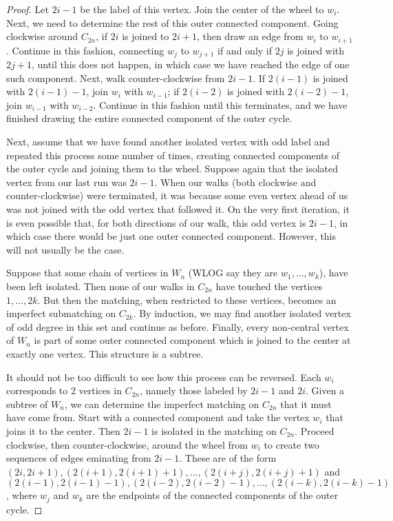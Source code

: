 \documentclass[12pt]{article}
\begin{document}
\begin{enumerate}[leftmargin=0cm,itemindent=.5cm,labelwidth=\itemindent,labelsep=0cm,align=left]
\begin{proof}
Let $2i-1$ be the label of this vertex.  Join the center of the wheel to $w_i$.  Next, we need to determine the rest of this outer connected component.  Going clockwise around $C_{2n}$, if $2i$ is joined to $2i+1$, then draw an edge from $w_i$ to $w_{i+1}$.  Continue in this fashion, connecting $w_j$ to $w_{j+1}$ if and only if $2j$ is joined with $2j+1$, until this does not happen, in which case we have reached the edge of one such component.  Next, walk counter-clockwise from $2i-1$.  If $2(i-1)$ is joined with $2(i-1) - 1$, join $w_i$ with $w_{i-1}$; if $2(i-2)$ is joined with $2(i-2) - 1$, join $w_{i-1}$ with $w_{i-2}$.  Continue in this fashion until this terminates, and we have finished drawing the entire connected component of the outer cycle.

Next, assume that we have found another isolated vertex with odd label and repeated this process some number of times, creating connected components of the outer cycle and joining them to the wheel.  Suppose again that the isolated vertex from our last run was $2i-1$.  When our walks (both clockwise and counter-clockwise) were terminated, it was because some even vertex ahead of us was not joined with the odd vertex that followed it.  On the very first iteration, it is even possible that, for both directions of our walk, this odd vertex is $2i-1$, in which case there would be just one outer connected component.  However, this will not usually be the case.

Suppose that some chain of vertices in $W_n$ (WLOG say they are $w_1, \dots , w_k$), have been left isolated.  Then none of our walks in $C_{2n}$ have touched the vertices $1, \dots , 2k$.  But then the matching, when restricted to these vertices, becomes an imperfect submatching on $C_{2k}$.  By induction, we may find another isolated vertex of odd degree in this set and continue as before.  Finally, every non-central vertex of $W_n$ is part of some outer connected component which is joined to the center at exactly one vertex.  This structure is a subtree.

It should not be too difficult to see how this process can be reversed.  Each $w_i$ corresponds to 2 vertices in $C_{2n}$, namely those labeled by $2i-1$ and $2i$.  Given a subtree of $W_n$, we can determine the imperfect matching on $C_{2n}$ that it must have come from.  Start with a connected component and take the vertex $w_i$ that joins it to the center.  Then $2i-1$ is isolated in the matching on $C_{2n}$.  Proceed clockwise, then counter-clockwise, around the wheel from $w_i$ to create two sequences of edges eminating from $2i-1$.  These are of the form $(2i, 2i+1), (2(i+1), 2(i+1)+1), \dots , (2(i+j),2(i+j)+1)$ and $(2(i-1), 2(i-1)-1), (2(i-2), 2(i-2)-1), \dots , (2(i-k),2(i-k)-1)$, where $w_j$ and $w_k$ are the endpoints of the connected components of the outer cycle.


\end{proof}
\end{enumerate}
\end{document}
